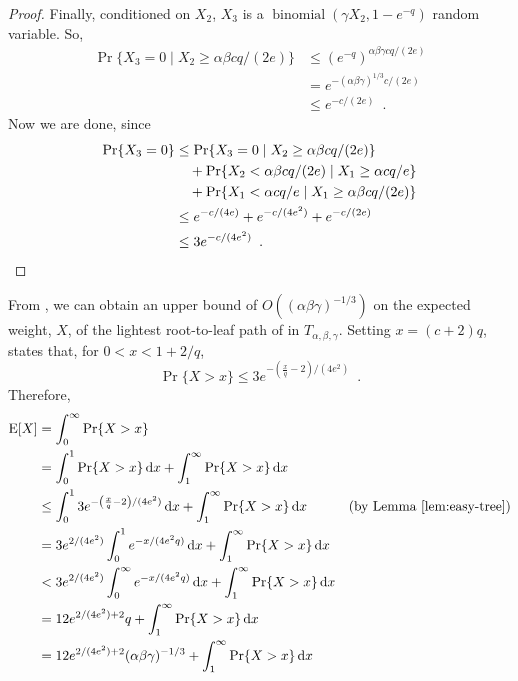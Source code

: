 \documentclass{patmorin}
\DeclareMathOperator{\binomial}{binomial}
\begin{document}
\begin{proof}
   Finally, conditioned on $X_2$, $X_3$ is a 
   $\binomial(\gamma X_2,1-e^{-q})$ random variable.  So,
   \begin{align*}
     \Pr\{X_3 = 0 \mid X_2 \ge \alpha\beta cq/(2e)\}
     & \le (e^{-q})^{\alpha\beta\gamma cq/(2e)} \\
     & = e^{-(\alpha\beta\gamma)^{1/3} c/(2e)} \\
     & \le e^{-c/(2e)} \enspace .
   \end{align*}
   Now we are done, since
   \begin{align*}
      \Pr\{X_3=0\} & \le \Pr\{X_3=0\mid X_2 \ge \alpha\beta cq/(2e)\} \\
         & \quad {} + \Pr\{X_2 < \alpha\beta cq/(2e) \mid X_1 \ge \alpha cq/e\} \\
         & \quad {} + \Pr\{X_1 < \alpha cq/e \mid X_1 \ge \alpha\beta cq/(2e)\} \\
         & \le e^{-c/(4e)} + e^{-c/(4e^2)} + e^{-c/(2e)} \\
         & \le 3e^{-c/(4e^2)} \enspace . \qedhere
   \end{align*}
\end{proof}

From , we can obtain an upper bound of
$O((\alpha\beta\gamma)^{-1/3})$ on the expected weight, $X$, of the
lightest root-to-leaf path of in $T_{\alpha,\beta,\gamma}$.  Setting
$x=(c+2)q$,  states that, for $0<x<1+2/q$,
\[
   \Pr\{X > x\} \le 3e^{-\left(\frac{x}{q}-2\right)/(4e^2)} \enspace .
\]
Therefore,
\begin{align*}
   \E[X] & = \int_0^{\infty} \Pr\{X > x\} \\
         & = \int_0^{1} \Pr\{X > x\}\,\mathrm{d}x + \int_1^{\infty} \Pr\{X > x\}\,\mathrm{d}x \\
         & \le \int_0^{1} 3e^{-\left(\frac{x}{q}-2\right)/(4e^2)}\,\mathrm{d}x + \int_1^{\infty} \Pr\{X > x\}\,\mathrm{d}x  & \text{(by \lemref{easy-tree})}\\
         & = 3e^{2/(4e^2)}\int_0^{1} e^{-x/(4e^2q)}\,\mathrm{d}x + \int_1^{\infty} \Pr\{X > x\}\,\mathrm{d}x \\
         & < 3e^{2/(4e^2)}\int_0^{\infty} e^{-x/(4e^2q)}\,\mathrm{d}x + \int_1^{\infty} \Pr\{X > x\}\,\mathrm{d}x \\
         & = 12e^{2/(4e^2)+2}q + \int_1^{\infty} \Pr\{X > x\}\,\mathrm{d}x \\
         & = 12e^{2/(4e^2)+2}(\alpha\beta\gamma)^{-1/3} + \int_1^{\infty} \Pr\{X > x\}\,\mathrm{d}x
\end{align*}
\end{document}
